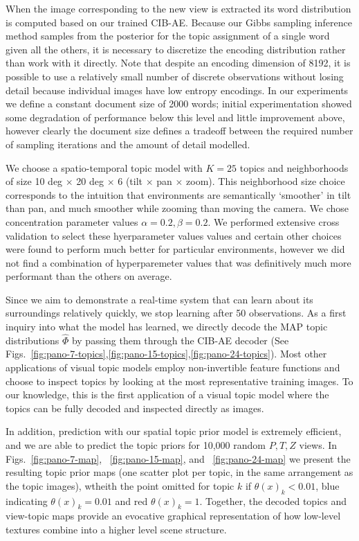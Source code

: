 When the image corresponding to the new view is extracted its word distribution is computed based on our trained CIB-AE. Because our Gibbs sampling inference method samples from the posterior for the topic assignment of a single word given all the others, it is necessary to discretize the encoding distribution rather than work with it directly. Note that despite an encoding dimension of 8192, it is possible to use a relatively small number of discrete observations without losing detail because individual images have low entropy encodings. In our experiments we define a constant document size of 2000 words; initial experimentation showed some degradation of performance below this level and little improvement above, however clearly the document size defines a tradeoff between the required number of sampling iterations and the amount of detail modelled.

We choose a spatio-temporal topic model with $K = 25$ topics and neighborhoods of size 10 deg $\times$ 20 deg $\times$ 6 (tilt $\times$ pan $\times$ zoom). This neighborhood size choice corresponds to the intuition that environments are semantically `smoother' in tilt than pan, and much smoother while zooming than moving the camera. We chose concentration parameter values $\alpha = 0.2, \beta = 0.2$. We performed extensive cross validation to select these hyerparameter values values and certain other choices were found to perform much better for particular environments, however we did not find a combination of hyperparemeter values that was definitively much more performant than the others on average.

Since we aim to demonstrate a real-time system that can learn about its surroundings relatively quickly, we stop learning after 50 observations. As a first inquiry into what the model has learned, we directly decode the MAP topic distributions $\hat{\Phi}$ by passing them through the CIB-AE decoder (See Figs.~\ref{fig:pano-7-topics},\ref{fig:pano-15-topics},\ref{fig:pano-24-topics}). Most other applications of visual topic models employ non-invertible feature functions and choose to inspect topics by looking at the most representative training images. To our knowledge, this is the first application of a visual topic model where the topics can be fully decoded and inspected directly as images.

In addition, prediction with our spatial topic prior model is extremely efficient, and we are able to predict the topic priors for 10,000 random $P,T,Z$ views. In Figs.~\ref{fig:pano-7-map}, ~\ref{fig:pano-15-map}, and ~\ref{fig:pano-24-map} we present the resulting topic prior maps (one scatter plot per topic, in the same arrangement as the topic images), wtheith the point omitted for topic $k$ if $\theta(x)_k < 0.01$, blue indicating $\theta(x)_k = 0.01$ and red $\theta(x)_k = 1$. Together, the decoded topics and view-topic maps provide an evocative graphical representation of how low-level textures combine into a higher level scene structure.

